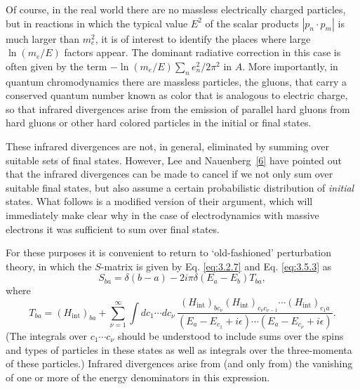 Of course, in the real world there are no massless electrically charged
particles, but in reactions in which the typical value $E^2$ of the scalar
products $|p_n\cdot p_m|$ is much larger than $m_e^2$, it is of interest to
identify the places where large $\ln(m_e/E)$ factors appear. The dominant
radiative correction in this case is often given by the term
$-\ln(m_e/E)\sum_n e_n^2/2\pi^2$ in $A$. More importantly, in quantum
chromodynamics there are massless particles, the gluons, that carry a
conserved quantum number known as color that is analogous to electric charge,
so that infrared divergences arise from the emission of parallel hard gluons
from hard gluons or other hard colored particles in the initial or final
states.

These infrared divergences are not, in general, eliminated by summing over
suitable sets of final states. However, Lee and
Nauenberg~\hyperref[ref:13.6]{[6]} have pointed out that the infrared
divergences can be made to cancel if we not only sum over suitable final
states, but also assume a certain probabilistic distribution of \emph{initial}
states. What follows is a modified version of their argument, which will
immediately make clear why in the case of electrodynamics with massive
electrons it was sufficient to sum over final states.

For these purposes it is convenient to return to `old-fashioned' perturbation
theory, in which the $S$-matrix is given by Eq. \eqref{eq:3.2.7} and
Eq. \eqref{eq:3.5.3} as
\begin{equation}
S_{ba}=\delta(b-a)-2i\pi\delta(E_a-E_b)T_{ba},
\tag{13.4.1}\label{eq:13.4.1}
\end{equation}
where
\begin{equation}
T_{ba}=(H_{\mathrm{int}})_{ba}
+\sum_{\nu=1}^{\infty}\int dc_1\cdots dc_\nu\,
\frac{(H_{\mathrm{int}})_{bc_\nu}
(H_{\mathrm{int}})_{c_\nu c_{\nu-1}}\cdots
(H_{\mathrm{int}})_{c_1a}}
{(E_a-E_{c_1}+i\epsilon)\cdots(E_a-E_{c_\nu}+i\epsilon)}.
\tag{13.4.2}\label{eq:13.4.2}
\end{equation}
(The integrals over $c_1\cdots c_\nu$ should be understood to include sums
over the spins and types of particles in these states as well as integrals
over the three-momenta of these particles.) Infrared divergences arise from
(and only from) the vanishing of one or more of the energy denominators in
this expression.

